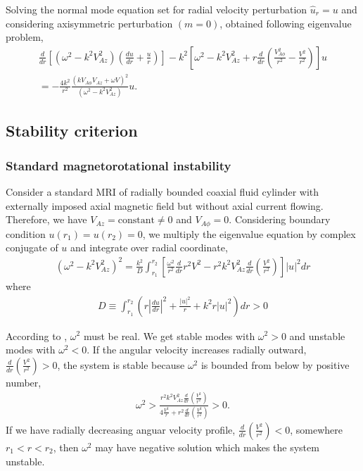 \documentclass{jfm}
\begin{document}
Solving the normal mode equation set for radial velocity perturbation 
$\hat{u}_r = u$ and considering axisymmetric perturbation $(m=0)$, 
\cite{Acheson1973a} obtained following eigenvalue problem,
\begin{align}
    \frac{d}{dr}\left[(\omega^2-k^2 V_{Az}^2)\left(\frac{du}{dr}+\frac{u}{r}\right)\right]-k^2\left[\omega^2-k^2 V_{Az}^2+r\frac{d}{dr}\left(\frac{V_{A\phi}^2}{r^2}-\frac{V^2}{r^2}\right)\right]u \nonumber \\
    = -\frac{4 k^2}{r^2}\frac{(k V_{A\phi} V_{Az}+\omega V)^2}{(\omega^2-k^2 V_{Az}^2)} u.
\end{align}


%
%
\subsection{Stability criterion}

\subsubsection{Standard magnetorotational instability}

Consider a standard MRI of radially bounded coaxial fluid cylinder with 
externally imposed axial magnetic field but without axial current flowing. 
Therefore, we have $V_{Az} = \text{constant} \neq 0$ and 
$V_{A\phi} = 0$. Considering boundary condition 
$u(r_1)=u(r_2)=0$, we multiply the eigenvalue equation by complex conjugate 
of $u$ and integrate over radial coordinate,
\begin{align}
    (\omega^2-k^2 V_{Az}^2)^2 = \frac{k^2}{D}\int_{r_1}^{r_2}\left[\frac{\omega^2}{r^2}\frac{d}{dr}r^2V^2 -r^2 k^2 V_{Az}^2 \frac{d}{dr}\left(\frac{V^2}{r^2}\right)\right]|u|^2 dr
\end{align}   
where 
\begin{align}
    D\equiv \int_{r_1}^{r_2}\left(r \left|\frac{du}{dr}\right|^2 +\frac{|u|^2}{r}+k^2 r |u|^2 \right) dr >0
\end{align}

According to \cite{Chandrasekhar1960}, $\omega^2$ must be real. We get stable 
modes with $\omega^2>0$ and unstable modes with $\omega^2<0$. If the angular 
velocity increases radially outward, $\frac{d}{dr}\left(\frac{V^2}{r^2}\right)>0$, 
the system is stable because $\omega^2$ is bounded from below by positive number, 
\begin{align}
    \omega^2>\frac{r^2k^2 V_{Az}^2 \frac{d}{dr}\left(\frac{V^2}{r^2}\right)}{4\frac{V^2}{r}+r^2\frac{d}{dr}\left(\frac{V^2}{r^2}\right)}>0.
\end{align}
If we have radially decreasing anguar velocity profile, 
$\frac{d}{dr}\left(\frac{V^2}{r^2}\right)<0$, somewhere $r_1<r<r_2$, then 
$\omega^2$ may have negative solution which makes the system unstable.
\end{document}
